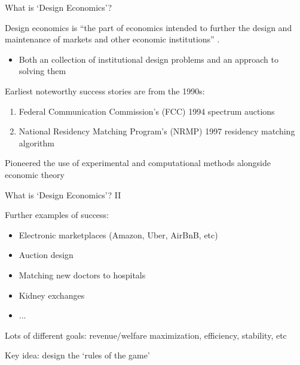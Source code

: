 \documentclass[aspectratio=169,xcolor=dvipsnames]{beamer}
\begin{document}
\begin{frame}{What is `Design Economics'?}

Design economics is ``the part of economics intended to further the design and maintenance of markets and other economic institutions'' \autocite[1341]{roth2002}.
\begin{itemize}
    \item Both an collection of institutional design problems and an approach to solving them
\end{itemize}

\vspace{5mm}
Earliest noteworthy success stories are from the 1990s:
\begin{enumerate}
    \item Federal Communication Commission's (FCC) 1994 spectrum auctions
    \item National Residency Matching Program's (NRMP) 1997 residency matching algorithm
\end{enumerate}

\vspace{5mm}
Pioneered the use of experimental and computational methods alongside economic theory

\end{frame}


\begin{frame}{What is `Design Economics'? II}

Further examples of success:
\begin{itemize}
    \item Electronic marketplaces (Amazon, Uber, AirBnB, etc)
    \item Auction design \autocite{binmore2002, alphabet2024}
    \item Matching new doctors to hospitals \autocite{roth1999}
    \item Kidney exchanges \autocite{roth2007hbs}
    \item ...
\end{itemize}

\vspace{5mm}
Lots of different goals: revenue/welfare maximization, efficiency, stability, etc

\vspace{5mm}
{\color{red}Key idea: design the `rules of the game'}

\end{frame}
\end{document}
